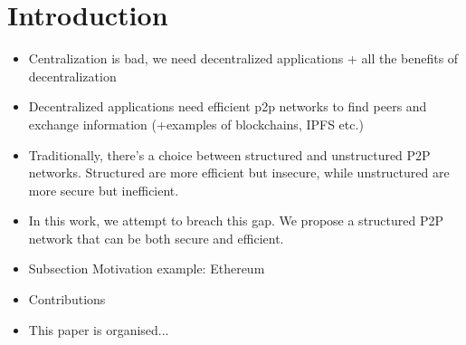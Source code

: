 
\section{Introduction}
\begin{itemize}
    \item Centralization is bad, we need decentralized applications + all the benefits of decentralization
    \item Decentralized applications need efficient p2p networks to find peers and exchange information (+examples of blockchains, IPFS etc.)
    \item Traditionally, there's a choice between structured and unstructured P2P networks. Structured are more efficient but insecure, while unstructured are more secure but inefficient. 
    \item In this work, we attempt to breach this gap. We propose a structured P2P network that can be both secure and efficient. 
    \item Subsection Motivation example: Ethereum
    \item Contributions
    \item This paper is organised...
\end{itemize}
